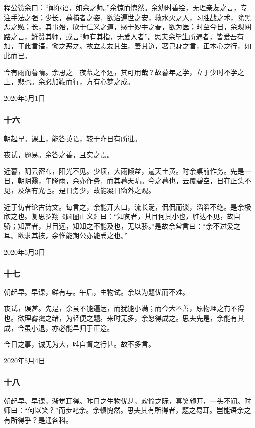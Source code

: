 \documentclass[a5paper]{ctexart}
\begin{document}
	程公赞余曰：“闻尔语，如余之师。”余惊而愧然。余幼时善绘，无理亲友之言，专注手法之强；少长，慕捕者之姿，欲治遍世之安，救水火之人，习胜战之术，除黑恶之贼；长，其事殆，欣于仁义之道，感于妙手之春，欲为医；时至今日，余观网路之言，鲜赞其师，或言“师有其指，无爱人者”。思夫余毕生所遇者，皆爱吾有加，于此言语，恸之恶之。故立志友其生，善其道，著己身之言，正本心之行，如此而已。
	
	今有雨而暮晴。余思之：夜幕之不远，其可用哉？故暮年之学，立于少时不学之上，悲也。余必加鞭而行，方有心梦之成。
	\begin{flushright}
		2020年6月1日
	\end{flushright}
	
	\subsubsection{十六}
	朝起早。课上，能答英语，较于昨日有所进。
	
	夜试，题易。余答之善，且实之焉。
	
	近暮，阴云密布，阳光不见。少顷，大雨倾盆，遍天土黄。时余桌前作务。先是一日，朝阴翳，午降雨，余亦作务，而其暮天晴。今之暮也，云覆碧空，日在正头不见，及落有光也。是日务少，故能凝目窗外之观。
	
	近于俦者论古诗文。每言之，余能开大口，流长涎，侃侃而谈，滔滔不绝。是余极欣之也。复思罗翔《圆圈正义》曰：“知贫者，其目何其小也，胜达不见，故自骄；知富者，其目远，知知之不能及也，无以骄。”是故余常言曰：“余不过爱之耳。欲求其技，余惟能期公亦能爱之也。”
	\begin{flushright}
		2020年6月3日
	\end{flushright}
	
	\subsubsection{十七}
	朝起早。早课，鲜有与。午后，生物试。余以为题优而不难。
	
	夜试，误甚。先是，余虽不能遍达，而犹能小满；而今大不善，原物理之有不得也。欲理雾霭之绪，为轻便之题。来时无多，余愿得成之。思夫先是，余能有其成，今虽小退，亦必能早归于正途。
	
	今日之事，诚无为大，唯自督之行甚。故不多言。
	\begin{flushright}
		2020年6月4日
	\end{flushright}
	
	\subsubsection{十八}
	朝起早。早课，渐觉耳得。昨日之生物优甚，欢愉之际，喜笑颜开，一头不闻。时师曰：“何以笑？”而步叱余。余顿愧然。思夫其有所得者，题之易耳。岂能语余之有所得乎？是通各科。
	
\end{document}
